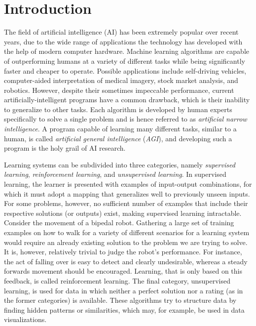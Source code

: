 \section{Introduction}
The field of artificial intelligence (AI) has been extremely popular over recent years, due to the wide range of applications the technology has developed with the help of modern computer hardware. Machine learning algorithms are capable of outperforming humans at a variety of different tasks while being significantly faster and cheaper to operate. Possible applications include self-driving vehicles, computer-aided interpretation of medical imagery, stock market analysis, and robotics. However, despite their sometimes impeccable performance, current artificially-intelligent programs have a common drawback, which is their inability to generalize to other tasks. Each algorithm is developed by human experts specifically to solve a single problem and is hence referred to as \textit{artificial narrow intelligence}. A program capable of learning many different tasks, similar to a human, is called \textit{artificial general intelligence} (\textit{AGI}), and developing such a program is the holy grail of AI research.

Learning systems can be subdivided into three categories, namely \textit{supervised learning}, \textit{reinforcement learning}, and \textit{unsupervised learning}. In supervised learning, the learner is presented with examples of input-output combinations, for which it must adopt a mapping that generalizes well to previously unseen inputs. For some problems, however, no sufficient number of examples that include their respective solutions (or outputs) exist, making supervised learning intractable. Consider the movement of a bipedal robot. Gathering a large set of training examples on how to walk for a variety of different scenarios for a learning system would require an already existing solution to the problem we are trying to solve. It is, however, relatively trivial to judge the robot's performance. For instance, the act of falling over is easy to detect and clearly undesirable, whereas a steady forwards movement should be encouraged. Learning, that is only based on this feedback, is called reinforcement learning. The final category, unsupervised learning, is used for data in which neither a perfect solution nor a rating (as in the former categories) is available. These algorithms try to structure data by finding hidden patterns or similarities, which may, for example, be used in data visualizations.

